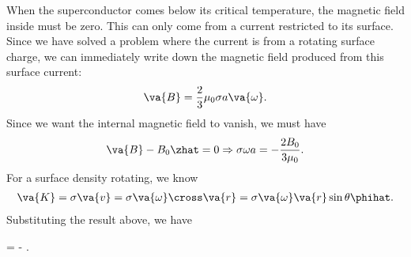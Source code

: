 \documentclass[12pt,a4paper]{article}
\begin{document}
When the superconductor comes below its critical temperature, the magnetic field inside must be zero.
This can only come from a current restricted to its surface.
Since we have solved a problem where the current is from a rotating surface charge, we can immediately write down the magnetic field produced from this surface current:
\begin{align*}
    \va{B} = \frac{2}{3} \mu_0 \sigma a \va{\omega}
.\end{align*}
Since we want the internal magnetic field to vanish, we must have
\begin{align*}
    \va{B} - B_0 \zhat = 0 \Rightarrow \sigma \omega a = -\frac{2 B_0}{3 \mu_0}
.\end{align*}
For a surface density rotating, we know
\begin{align*}
    \va{K} = \sigma \va{v} = \sigma \va{\omega} \cross \va{r} = \sigma \va{\omega} \va{r} \sin{\theta} \phihat
.\end{align*}
Substituting the result above, we have
\begin{eqbox}
     = - \sin{\theta} \phihat
.\end{eqbox}
\end{document}
